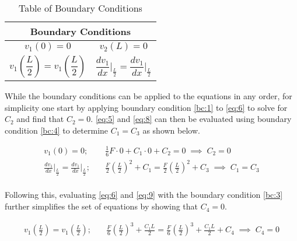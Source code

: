 \begin{table} [h]
	\centering
	\begin{tabularx}{\textwidth}{ | X  X | }
	\multicolumn{2}{c}{\textbf{Boundary Conditions}} \\ \hline
	\vbox{\begin{equation} \label{bc:1} v_1(0) = 0 \end{equation}} & \vbox{\begin{equation} \label{bc:2} v_2(L) = 0 \end{equation}} \\
	\vbox{\begin{equation} \label{bc:3} v_1\left(\frac{L}{2}\right) = v_1\left(\frac{L}{2}\right) \end{equation}} & \vbox{\begin{equation} \label{bc:4} \frac{dv_1}{dx}\vert_{\frac{L}{2}} = \frac{dv_1}{dx}\vert_{\frac{L}{2}} \end{equation}} \\ \hline
	\end{tabularx}
	\captionsetup{textformat=empty,labelformat=blank}
	\caption{Table of Boundary Conditions}
	\label{tab:bounds}
\end{table}
\par


While the boundary conditions can be applied to the equations in any order, for simplicity one start by applying boundary condition \eqref{bc:1} to \eqref{eq:6} to solve for $C_2$ and find that $C_2 = 0$. \eqref{eq:5} and \eqref{eq:8} can then be evaluated using boundary condition \eqref{bc:4} to determine $C_1 = C_3$ as shown below.

\begin{align*}
v_1(0) = 0; & \quad \frac{1}{6}F\cdot0 + C_1\cdot0 + C_2 = 0 \; \implies \; C_2 = 0 \\
\frac{dv_1}{dx}\vert_{\frac{L}{2}} = \frac{dv_1}{dx}\vert_{\frac{L}{2}}; & \quad \frac{F}{2}\left(\frac{L}{2}\right)^2 + C_1 = \frac{F}{2}\left(\frac{L}{2}\right)^2 + C_3 \; \implies \; C_1 = C_3 \\
\end{align*}

Following this, evaluating \eqref{eq:6} and \eqref{eq:9} with the boundary condition \eqref{bc:3} further simplifies the set of equations by showing that $C_4 = 0$.

\begin{align*}
v_1\left(\frac{L}{2}\right) = v_1\left(\frac{L}{2}\right); & \quad  \frac{F}{6}\left(\frac{L}{2}\right)^3 + \frac{C_1L}{2} = \frac{F}{6}\left(\frac{L}{2}\right)^3 + \frac{C_1L}{2} + C_4 \; \implies \; C_4 = 0
\end{align*}

